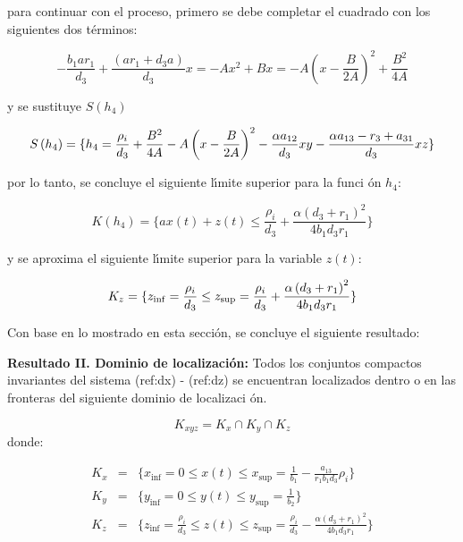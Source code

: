 \documentclass[letterpaper,11pt]{article}
\begin{document}
para continuar con el proceso, primero se debe completar el cuadrado con los
siguientes dos t\'{e}rminos:

\begin{equation*}
-\frac{b_{1}ar_{1}}{d_{3}}+\frac{\left( ar_{1}+d_{3}a\right) }{d_{3}}%
x=-Ax^{2}+Bx=-A\left( x-\frac{B}{2A}\right) ^{2}+\frac{B^{2}}{4A}
\end{equation*}

y se sustituye $S\left( h_{4}\right) $

\begin{equation*}
S\left( h_{4}\right) =\{h_{4}=\frac{\rho _{i}}{d_{3}}+\frac{B^{2}}{4A}%
-A\left( x-\frac{B}{2A}\right) ^{2}-\frac{\alpha a_{12}}{d_{3}}xy-\frac{%
\alpha a_{13}-r_{3}+a_{31}}{d_{3}}xz\}
\end{equation*}

por lo tanto, se concluye el siguiente l\'{\i}mite superior para la funci%
\'{o}n $h_{4}$:

\begin{equation*}
K\left( h_{4}\right) =\{ax\left( t\right) +z\left( t\right) \leq \frac{\rho
_{i}}{d_{3}}+\frac{\alpha \left( d_{3}+r_{1}\right) ^{2}}{4b_{1}d_{3}r_{1}}\}
\end{equation*}

y se aproxima el siguiente l\'{\i}mite superior para la variable $z\left(
t\right) $:

\begin{equation*}
K_{z}=\{z_{\inf }=\frac{\rho _{i}}{d_{3}}\leq z_{\sup }=\frac{\rho _{i}}{%
d_{3}}+\frac{\alpha \left( d_{3}+r_{1}\right) ^{2}}{4b_{1}d_{3}r_{1}}\}
\end{equation*}

Con base en lo mostrado en esta secci\'{o}n, se concluye el siguiente
resultado:

\bigskip

\textbf{Resultado II. Dominio de localizaci\'{o}n: }Todos los conjuntos
compactos invariantes del sistema (ref:dx) - (ref:dz) se encuentran
localizados dentro o en las fronteras del siguiente dominio de localizaci%
\'{o}n.

\begin{equation*}
K_{xyz}=K_{x}\cap K_{y}\cap K_{z}
\end{equation*}%
donde:

\begin{eqnarray*}
K_{x} &=&\{x_{\inf }=0\leq x\left( t\right) \leq x_{\sup }=\frac{1}{b_{1}}-%
\frac{a_{13}}{r_{1}b_{1}d_{3}}\rho _{i}\} \\
K_{y} &=&\{y_{\inf }=0\leq y\left( t\right) \leq y_{\sup }=\frac{1}{b_{2}}\}
\\
K_{z} &=&\{z_{\inf }=\frac{\rho _{i}}{d_{3}}\leq z\left( t\right) \leq
z_{\sup }=\frac{\rho _{i}}{d_{3}}-\frac{\alpha \left( d_{3}+r_{1}\right) ^{2}%
}{4b_{1}d_{3}r_{1}}\}
\end{eqnarray*}
\end{document}
